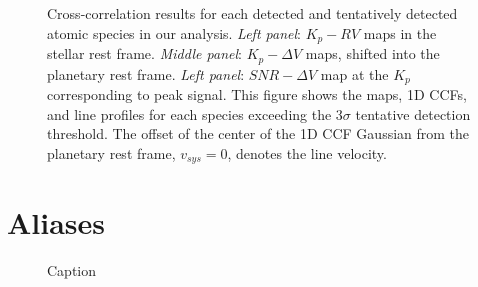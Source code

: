 \documentclass[twocolumn]{aastex631}
\begin{document}
        \begin{figure}
                
             \caption{Cross-correlation results for each detected and tentatively detected atomic species in our analysis. \textit{Left panel}: $K_p-RV$ maps in the stellar rest frame. \textit{Middle panel}: $K_p-\Delta V$ maps, shifted into the planetary rest frame.
            \textit{Left panel}: $SNR-\Delta V$ map at the $K_p$ corresponding to peak signal. This figure shows the  maps, 1D CCFs, and line profiles for each species exceeding the ${3\sigma}$ tentative detection threshold. The offset of the center of the 1D CCF Gaussian from the planetary rest frame, ${v_{sys}}=0$, denotes the line velocity.}
        \end{figure}

    \section{Aliases}
        \begin{figure}
            \gridline{
                \fig{}{}{}
            }
            \caption{Caption}
            \label{fig:enter-label}
        \end{figure}
    
{}
       
    \clearpage
\end{document}
